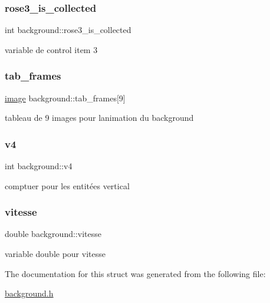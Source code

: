 \subsubsection{\texorpdfstring{rose3\+\_\+is\+\_\+collected}{rose3\_is\_collected}}
{\footnotesize\ttfamily int background\+::rose3\+\_\+is\+\_\+collected}

variable de control item 3 \mbox{\label{structbackground_a6e15278cd1578b2041fb0f4c0d7f2d89}} 
\subsubsection{\texorpdfstring{tab\+\_\+frames}{tab\_frames}}
{\footnotesize\ttfamily \hyperlink{structimage}{image} background\+::tab\+\_\+frames\mbox{[}9\mbox{]}}

tableau de 9 images pour l\textquotesingle{}animation du background \mbox{\label{structbackground_add459e778424b8d7a87713503581a554}} 
\subsubsection{\texorpdfstring{v4}{v4}}
{\footnotesize\ttfamily int background\+::v4}

comptuer pour les entitées vertical \mbox{\label{structbackground_a6585242e38afc14d33512807d0a0c37f}} 
\subsubsection{\texorpdfstring{vitesse}{vitesse}}
{\footnotesize\ttfamily double background\+::vitesse}

variable double pour vitesse 

The documentation for this struct was generated from the following file\+:\begin{DoxyCompactItemize}
\item 
\hyperlink{background_8h}{background.\+h}\end{DoxyCompactItemize}
